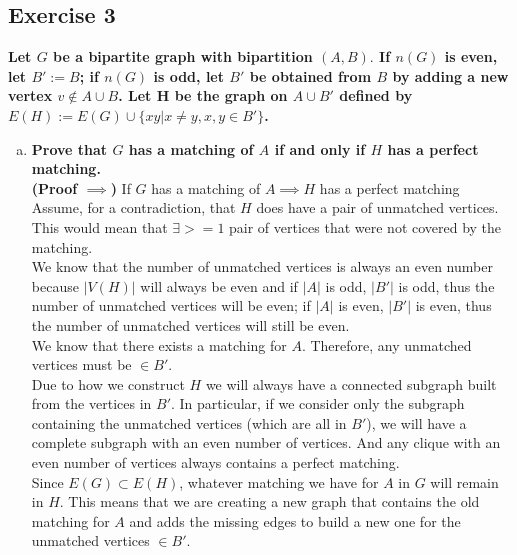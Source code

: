 \subsection*{Exercise 3}

\boldmath
\textbf{Let $G$ be a bipartite graph with bipartition $(A, B).$ If $n(G)$ is even, let $B':= B$; if $n(G)$ is odd, let $B'$ be obtained from $B$ by adding a new vertex $v \notin A \cup B$. Let H be the graph on $A \cup B'$ defined by $E(H) := E(G) \cup \{xy | x \neq y, x, y \in B'\}$.}
\unboldmath

\begin{enumerate}[a)]
    \boldmath
    \item \textbf{Prove that $G$ has a matching of $A$ if and only if $H$ has a perfect matching.} \\
    \linebreak 
    \textbf{(Proof $\implies$)} \unboldmath  If $G$ has a matching of $A \implies H$ has a perfect matching \\
    \linebreak 
    Assume, for a contradiction, that $H$ does have a pair of unmatched vertices. This would mean that $\exists >= 1$ pair of vertices that were not covered by the matching. \\
    \linebreak 
    We know that the number of unmatched vertices is always an even number because $|V(H)|$ will always be even and if $|A|$ is odd, $|B'|$ is odd, thus the number of unmatched vertices will be even; if $|A|$ is even, $|B'|$ is even, thus the number of unmatched vertices will still be even. \\
    \linebreak 
    We know that there exists a matching for $A$. Therefore, any unmatched vertices must be $\in B'$. \\
    \linebreak 
    Due to how we construct $H$ we will always have a connected subgraph built from the vertices in $B'$. In particular, if we consider only the subgraph containing the unmatched vertices (which are all in $B'$), we will have a complete subgraph with an even number of vertices. And any clique with an even number of vertices always contains a perfect matching. \\
    \linebreak 
    Since $E(G) \subset E(H)$, whatever matching we have for $A$ in $G$ will remain in $H$. This means that we are creating a new graph that contains the old matching for $A$ and adds the missing edges to build a new one for the unmatched vertices $\in B'$. \\

\end{enumerate}
